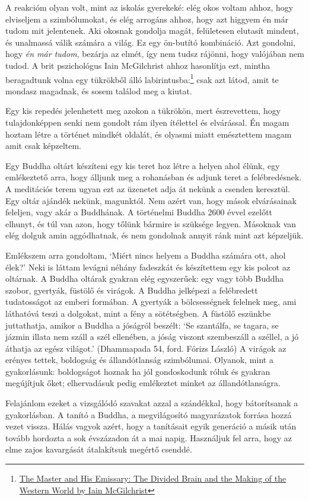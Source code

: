 A reakcióm olyan volt, mint az iskolás gyerekeké: elég okos voltam
ahhoz, hogy elviseljem a szimbólumokat, és elég arrogáns ahhoz, hogy azt
higgyem én már tudom mit jelentenek. Aki okosnak gondolja magát,
felületesen elutasít mindent, és unalmassá válik számára a világ. Ez egy
ön-butító kombináció. Azt gondolni, hogy \emph{én már tudom}, bezárja az
elmét, így nem tudsz rájönni, hogy valójában nem tudod. A brit
pszichológus Iain McGilchrist ahhoz hasonlítja ezt, mintha beragadtunk
volna egy tükrökből álló labirintusba:\footnote{\href{https://www.goodreads.com/book/show/6968772-the-master-and-his-emissary}{The
  Master and His Emissary: The Divided Brain and the Making of the
  Western World by Iain McGilchrist}} csak azt látod, amit te mondasz
magadnak, és sosem találod meg a kiutat.

Egy kis repedés jelenhetett meg azokon a tükrökön, mert észrevettem,
hogy tulajdonképpen senki nem gondolt rám ilyen ítélettel és elvárással.
Én magam hoztam létre a történet mindkét oldalát, és olyasmi miatt
emésztettem magam amit csak képzeltem.

Egy Buddha oltárt készíteni egy kis teret hoz létre a helyen ahol élünk,
egy emlékeztető arra, hogy álljunk meg a rohanásban és adjunk teret a
felébredésnek. A meditációs terem ugyan ezt az üzenetet adja át nekünk a
csenden keresztül. Egy oltár ajándék nekünk, magunktól. Nem azért van,
hogy mások elvárásainak feleljen, vagy akár a Buddhának. A történelmi
Buddha 2600 évvel ezelőtt elhunyt, és túl van azon, hogy tőlünk bármire
is szüksége legyen. Másoknak van elég dolguk amin aggódhatnak, és nem
gondolnak annyit ránk mint azt képzeljük.

Emlékszem arra gondoltam, `Miért nincs helyem a Buddha számára ott, ahol
élek?' Neki is láttam levágni néhány fadeszkát és készítettem egy kis
polcot az oltárnak. A Buddha oltárak gyakran elég egyszerűek: egy vagy
több Buddha szobor, gyertyák, füstölő és virágok. A Buddha jelképezi a
felébredett tudatosságot az emberi formában. A gyertyák a bölcsességnek
felelnek meg, ami láthatóvá teszi a dolgokat, mint a fény a sötétségben.
A füstölő eszünkbe juttathatja, amikor a Buddha a jóságról beszélt: `Se
szantálfa, se tagara, se jázmin illata nem száll a szél ellenében, a
jóság viszont szembeszáll a széllel, a jó áthatja az egész világot.'
(Dhammapada 54, ford. Fórizs László) A virágok az erényes tettek,
boldogság és állandótlanság szimbólumai. Olyanok, mint a gyakorlásunk:
boldogságot hoznak ha jól gondoskodunk róluk és gyakran megújítjuk őket;
elhervadásuk pedig emlékeztet minket az állandótlanságra.

Felajánlom ezeket a vizsgálódó szavakat azzal a szándékkal, hogy
bátorítsanak a gyakorlásban. A tanító a Buddha, a megvilágosító
magyarázatok forrása hozzá vezet vissza. Hálás vagyok azért, hogy a
tanításait egyik generáció a másik után tovább hordozta a sok évszázadon
át a mai napig. Használjuk fel arra, hogy az elme zajos kavargását
átalakítsuk megértő csenddé.
